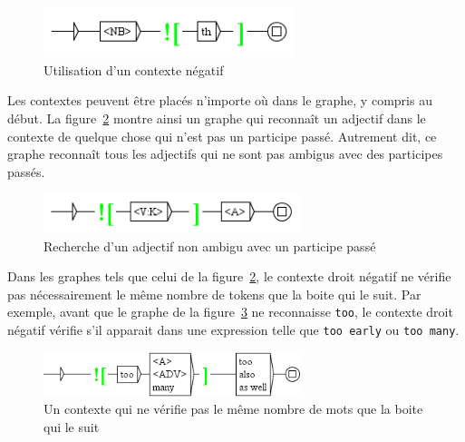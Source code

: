 \begin{figure}[!h]
\begin{center}
\includegraphics[width=7.3cm]{resources/img/fig6-13.png}
\caption{Utilisation d’un contexte négatif\label{fig-context2}}
\end{center}
\end{figure}

\bigskip
\noindent Les contextes peuvent être placés n’importe où dans le graphe, y compris au début. La
figure~\ref{fig-context3} montre ainsi un graphe qui reconnaît un adjectif dans le contexte de
quelque
chose qui n’est pas un participe passé. Autrement dit, ce graphe reconnaît tous les adjectifs
qui ne sont pas ambigus avec des participes passés.

\begin{figure}[!h]
\begin{center}
\includegraphics[width=7.5cm]{resources/img/fig6-14.png}
\caption{Recherche d’un adjectif non ambigu avec un participe passé\label{fig-context3}}
\end{center}
\end{figure}

\bigskip
\noindent Dans les graphes tels que celui de la figure~\ref{fig-context3}, le contexte droit négatif
ne vérifie pas nécessairement le même nombre de tokens que la boite qui le suit. Par exemple, avant
que le graphe de la figure~\ref{too-also} ne reconnaisse \verb+too+, le contexte droit négatif
vérifie s'il apparait dans une expression telle que \verb+too early+ ou \verb+too many+.

\begin{figure}[!h]
\begin{center}
\includegraphics[width=7.5cm]{resources/img/fig-too-also.png}
\caption{Un contexte qui ne vérifie pas le même nombre de mots que la boite qui le suit\label{too-also}}
\end{center}
\end{figure}

